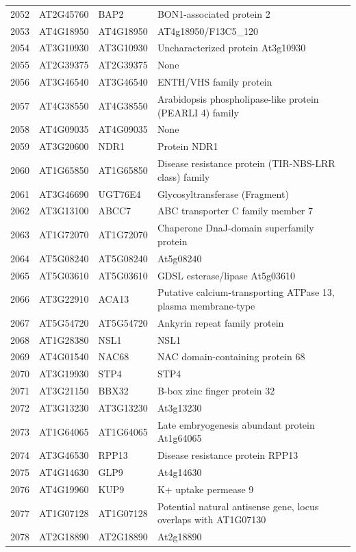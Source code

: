 \documentclass[11pt]{article}
\begin{document}
\begin{center}
\begin{tabular}{rlll}
2052 & AT2G45760 & BAP2 & BON1-associated protein 2\\
2053 & AT4G18950 & AT4G18950 & AT4g18950/F13C5\_120\\
2054 & AT3G10930 & AT3G10930 & Uncharacterized protein At3g10930\\
2055 & AT2G39375 & AT2G39375 & None\\
2056 & AT3G46540 & AT3G46540 & ENTH/VHS family protein\\
2057 & AT4G38550 & AT4G38550 & Arabidopsis phospholipase-like protein (PEARLI 4) family\\
2058 & AT4G09035 & AT4G09035 & None\\
2059 & AT3G20600 & NDR1 & Protein NDR1\\
2060 & AT1G65850 & AT1G65850 & Disease resistance protein (TIR-NBS-LRR class) family\\
2061 & AT3G46690 & UGT76E4 & Glycosyltransferase (Fragment)\\
2062 & AT3G13100 & ABCC7 & ABC transporter C family member 7\\
2063 & AT1G72070 & AT1G72070 & Chaperone DnaJ-domain superfamily protein\\
2064 & AT5G08240 & AT5G08240 & At5g08240\\
2065 & AT5G03610 & AT5G03610 & GDSL esterase/lipase At5g03610\\
2066 & AT3G22910 & ACA13 & Putative calcium-transporting ATPase 13, plasma membrane-type\\
2067 & AT5G54720 & AT5G54720 & Ankyrin repeat family protein\\
2068 & AT1G28380 & NSL1 & NSL1\\
2069 & AT4G01540 & NAC68 & NAC domain-containing protein 68\\
2070 & AT3G19930 & STP4 & STP4\\
2071 & AT3G21150 & BBX32 & B-box zinc finger protein 32\\
2072 & AT3G13230 & AT3G13230 & At3g13230\\
2073 & AT1G64065 & AT1G64065 & Late embryogenesis abundant protein At1g64065\\
2074 & AT3G46530 & RPP13 & Disease resistance protein RPP13\\
2075 & AT4G14630 & GLP9 & At4g14630\\
2076 & AT4G19960 & KUP9 & K+ uptake permease 9\\
2077 & AT1G07128 & AT1G07128 & Potential natural antisense gene, locus overlaps with AT1G07130\\
2078 & AT2G18890 & AT2G18890 & At2g18890\\

\end{tabular}
\end{center}
\end{document}
